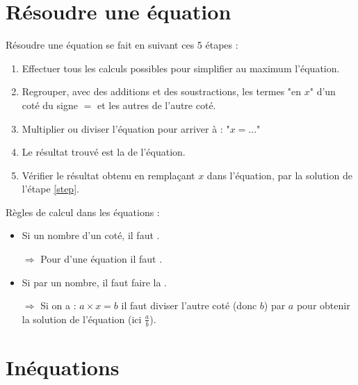 \documentclass[12pt,a4paper]{article}
\begin{document}
\section{Résoudre une équation}

\begin{mymeth}
	Résoudre une équation se fait en suivant ces 5 étapes :
	\begin{enumerate}
		\item Effectuer tous les calculs possibles pour simplifier au maximum l'équation.
		\item Regrouper, avec des additions et des soustractions, les termes "en $x$" d'un coté du signe $=$ et les autres de l'autre coté.
		\item Multiplier ou diviser l'équation pour arriver à : "$x = ...$"
		\item Le résultat trouvé est la  de l'équation.\label{step}
		\item Vérifier le résultat obtenu en remplaçant $x$ dans l'équation, par la solution de l'étape \ref{step}.
	\end{enumerate}
	
	
\end{mymeth}


\begin{myprops}
	Règles de calcul dans les équations :
	\begin{itemize}
		\item Si  un nombre d'un coté, il faut .\label{rule1}
		\item[$\Rightarrow$] Pour  d'une équation il faut .\label{rule1.1}
		\item Si  par un nombre, il faut faire la .\label{rule2}
		\item[$\Rightarrow$] Si on a : $a \times x = b$ il faut diviser l'autre coté (donc $b$) par $a$ pour obtenir la solution de l'équation (ici $\frac{a}{b}$).\label{rule2.1}   
		
	\end{itemize}
\end{myprops}

\section{Inéquations}
\end{document}
